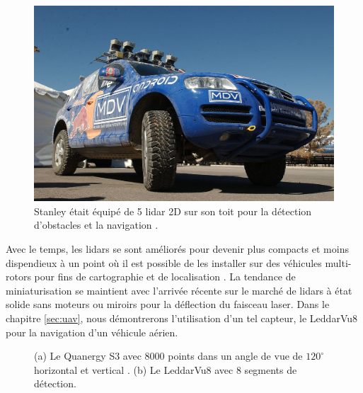 \begin{figure}[ht]
  \centering
  \includegraphics[width=0.5\linewidth]{images/stanley.jpg}
  \caption[Stanley la voiture autonome fonctionnant par lidar.]{Stanley était équipé de 5 lidar 2D sur son toit pour la détection d'obstacles et la navigation \citep{thrun2006stanley}.}
  \label{fig:stanley}
\end{figure}

Avec le temps, les lidars se sont améliorés pour devenir plus compacts et moins dispendieux à un point où il est possible de les installer sur des véhicules multi-rotors pour fins de cartographie et de localisation \citep{zhang2018aerial}. La tendance de miniaturisation se maintient avec l'arrivée récente sur le marché de lidars à état solide sans moteurs ou miroirs pour la déflection du faisceau laser. Dans le chapitre \ref{sec:uav}, nous démontrerons l'utilisation d'un tel capteur, le LeddarVu8 pour la navigation d'un véhicule aérien.

\begin{figure}[!h]
  \centering
  \caption[Lidars à état solide]{
    (a) Le Quanergy S3 avec $8000$ points dans un angle de vue de $120^\circ$ horizontal et vertical \citep{eldada2016}.
    (b) Le LeddarVu8 avec $8$ segments de détection.
  }
  \label{fig:lidars}
\end{figure}
